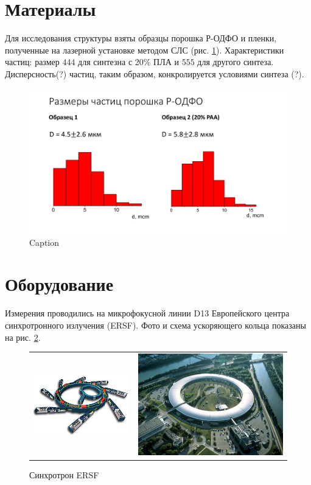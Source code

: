 \section{Материалы}
Для исследования структуры взяты образцы порошка Р-ОДФО и пленки, полученные на лазерной установке методом СЛС (рис. \ref{fig:particles}).
Характеристики частиц: размер $444$ для синтезна с 20\% ПЛА и $555$  для другого синтеза. Дисперсность(?) частиц, таким образом, конкролируется условиями синтеза (?).
	
	\begin{figure}[h]
	    \centering
	    \includegraphics[width=\linewidth]{fig/particles}
	    \caption{Caption}
	    \label{fig:particles}
	\end{figure}
	
\section{Оборудование}
	Измерения проводились на микрофокусной линии D13 Европейского центра синхротронного излучения (ERSF). Фото и схема ускоряющего кольца показаны на рис. \ref{fig:ring}. 
	
	
		\begin{figure}[h]\center
\begin{tabular}{cc}
\includegraphics[width=0.5\linewidth]{fig/pribor-scheme.jpg}
&
\includegraphics[width=0.5\linewidth]{fig/pribor-photo.jpg}
\end{tabular}
\caption{Синхротрон ERSF}
\label{fig:ring}
\end{figure}
	
